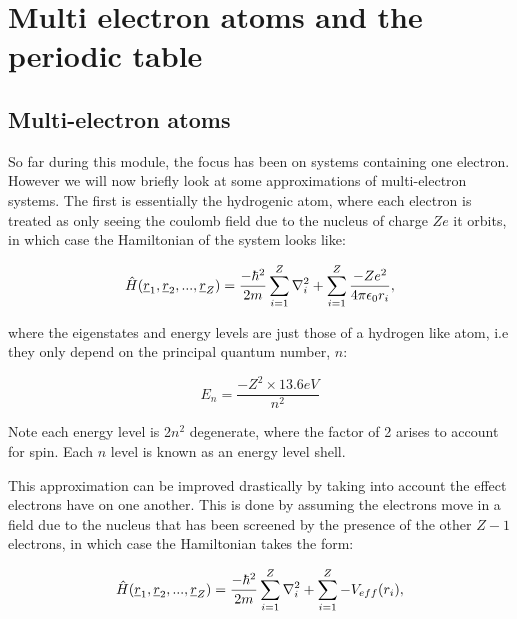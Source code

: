 \chapter{Multi electron atoms and the periodic table}
\label{chapt6}

\section{Multi-electron atoms}

So far during this module, the focus has been on systems containing one electron. However we will now briefly look at some approximations of multi-electron systems. The first is essentially the hydrogenic atom, where each electron is treated as only seeing the coulomb field due to the nucleus of charge $Ze$ it orbits, in which case the Hamiltonian of the system looks like:

\begin{equation}
    \Hat{H}(\underline{r}_1, \underline{r}_2, ..., \underline{r}_Z) = \frac{-\hbar^2}{2m} \sum^Z_{i=1} \nabla^2_i + \sum^Z_{i=1} \frac{-Ze^2}{4 \pi \epsilon_0 r_i},
    \label{HydrogenAtomApproximationHamiltonian}
\end{equation}

\noindent where the eigenstates and energy levels are just those of a hydrogen like atom, i.e they only depend on the principal quantum number, $n$:

\begin{equation}
    E_n = \frac{-Z^2 \times 13.6eV}{n^2}
    \label{HydrogenicAtomEnergyLevels}
\end{equation}

\noindent Note each energy level is 2$n^2$ degenerate, where the factor of 2 arises to account for spin. Each $n$ level is known as an energy level shell.

\noindent This approximation can be improved drastically by taking into account the effect electrons have on one another. This is done by assuming the electrons move in a field due to the nucleus that has been screened by the presence of the other $Z - 1$ electrons, in which case the Hamiltonian takes the form:

\begin{equation}
    \Hat{H}(\underline{r}_1, \underline{r}_2, ..., \underline{r}_Z) = \frac{-\hbar^2}{2m} \sum^Z_{i=1} \nabla^2_i + \sum^Z_{i=1} -V_{eff}(r_i),
    \label{ScreenedPotentialApproximationHamiltonian}
\end{equation}


